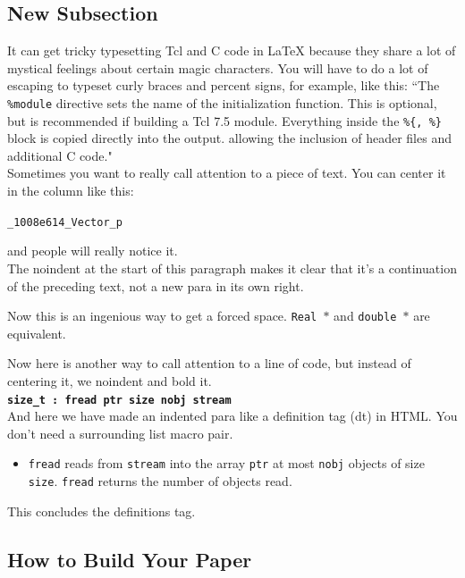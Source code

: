 \documentclass[letterpaper,twocolumn,10pt]{article}
\begin{document}
\subsection{New Subsection}

It can get tricky typesetting Tcl and C code in LaTeX because they share
a lot of mystical feelings about certain magic characters.  You
will have to do a lot of escaping to typeset curly braces and percent
signs, for example, like this:
``The {\tt \%module} directive
sets the name of the initialization function.  This is optional, but is
recommended if building a Tcl 7.5 module.
Everything inside the {\tt \%\{, \%\}}
block is copied directly into the output. allowing the inclusion of
header files and additional C code." \\

Sometimes you want to really call attention to a piece of text.  You
can center it in the column like this:
\begin{center}
{\tt \_1008e614\_Vector\_p}
\end{center}
and people will really notice it.\\

\noindent
The noindent at the start of this paragraph makes it clear that it's
a continuation of the preceding text, not a new para in its own right.


Now this is an ingenious way to get a forced space.
{\tt Real~$*$} and {\tt double~$*$} are equivalent. 

Now here is another way to call attention to a line of code, but instead
of centering it, we noindent and bold it.\\

\noindent
{\bf \tt size\_t : fread ptr size nobj stream } \\

And here we have made an indented para like a definition tag (dt)
in HTML.  You don't need a surrounding list macro pair.
\begin{itemize}
\item[]  {\tt fread} reads from {\tt stream} into the array {\tt ptr} at
most {\tt nobj} objects of size {\tt size}.   {\tt fread} returns
the number of objects read. 
\end{itemize}
This concludes the definitions tag.

\subsection{How to Build Your Paper}
\end{document}
